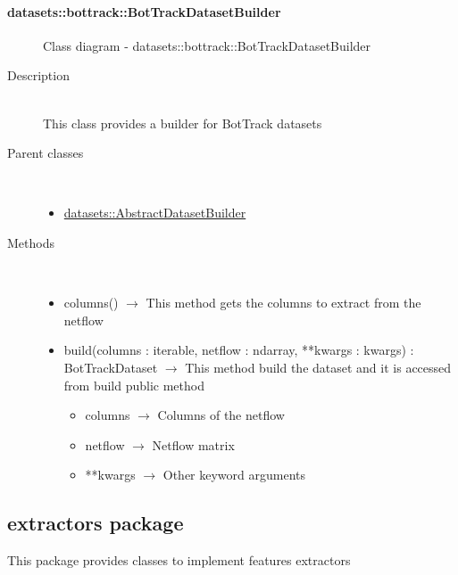 \paragraph[BotTrackDatasetBuilder]{datasets::bottrack::BotTrackDatasetBuilder}
 \hfill\begin{figure}[h]
\centering
{}
\caption{Class diagram - datasets::bottrack::BotTrackDatasetBuilder}
\end{figure}\begin{description}
\item[Description] \hfill \\
 This class provides a builder for BotTrack datasets
\item[Parent classes] \hfill \\
 \vspace{-1cm}
\begin{itemize}
\item \hyperlink{datasets::AbstractDatasetBuilder}{datasets::AbstractDatasetBuilder}
\end{itemize}

\item[Methods] \hfill \\
 \vspace{-1cm}
\begin{itemize}
\item columns() $\rightarrow$ This method gets the columns to extract from the netflow
\item build(columns : iterable, netflow : ndarray, **kwargs : kwargs) : BotTrackDataset $\rightarrow$ This method build the dataset and it is accessed from build public method\begin{itemize}
\item columns $\rightarrow$ Columns of the netflow
\item netflow $\rightarrow$ Netflow matrix
\item **kwargs $\rightarrow$ Other keyword arguments
\end{itemize}

\end{itemize}

\end{description}
\subsection{extractors package}
This package provides classes to implement features extractors

